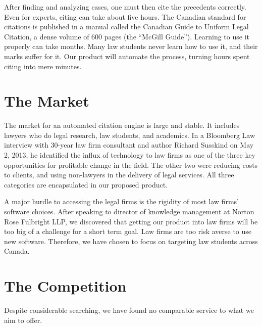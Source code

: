 \documentclass[11pt]{article}
\begin{document}
After finding and analyzing cases, one must then cite the precedents correctly. Even for experts, citing can take about five hours. The Canadian standard for citations is published in a manual called the Canadian Guide to Uniform Legal Citation, a dense volume of 600 pages (the ``McGill Guide''). Learning to use it properly can take months. Many law students never learn how to use it, and their marks suffer for it. Our product will automate the process, turning hours spent citing into mere minutes.

\section*{The Market}

The market for an automated citation engine is large and stable. It includes lawyers who do legal research, law students, and academics. In a Bloomberg Law interview with 30-year law firm consultant and author Richard Susskind on May 2, 2013, he identified the influx of technology to law firms as one of the three key opportunities for profitable change in the field. The other two were reducing costs to clients, and using non-lawyers in the delivery of legal services. All three categories are encapsulated in our proposed product. 

A major hurdle to accessing the legal firms is the rigidity of most law firms' software choices. After speaking to director of knowledge management at Norton Rose Fulbright LLP, we discovered that getting our product into law firms will be too big of a challenge for a short term goal. Law firms are too risk averse to use new software. Therefore, we have chosen to focus on targeting law students across Canada. 

\section*{The Competition}

Despite considerable searching, we have found no comparable service to what we aim to offer.
\end{document}
